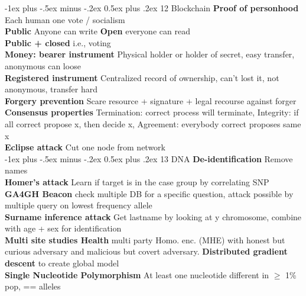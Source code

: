 \documentclass[10pt,landscape]{article}
\makeatletter
\renewcommand{\section}{\@startsection{section}{1}{0mm}%
                                {-1ex plus -.5ex minus -.2ex}%
                                {0.5ex plus .2ex}%
                                {\normalfont\large\bfseries}}
\makeatother
\begin{document}
\begin{multicols*}{4}
\section{12 Blockchain}
\textbf{Proof of personhood} Each human one vote / socialism\\
\textbf{Public} Anyone can write \textbf{Open} everyone can read\\
\textbf{Public + closed} i.e., voting\\
\textbf{Money: bearer instrument} Physical holder or holder of secret, easy transfer, anonymous can loose\\
\textbf{Registered instrument} Centralized record of ownership, can't lost it, not anonymous, transfer hard\\
\textbf{Forgery prevention} Scare resource + signature + legal recourse against forger\\
\textbf{Consensus properties} Termination: correct process will terminate, Integrity: if all correct propose x, then decide x, Agreement: everybody correct proposes same x\\
\textbf{Eclipse attack} Cut one node from network\\


\section{13 DNA}
\textbf{De-identification} Remove names\\
\textbf{Homer's attack} Learn if target is in the case group by correlating SNP\\
\textbf{GA4GH Beacon} check multiple DB for a specific question, attack possible by multiple query on lowest frequency allele\\
\textbf{Surname inference attack} Get lastname by looking at y chromosome, combine with age + sex for identification\\
\textbf{Multi site studies Health} multi party Homo. enc. (MHE) with honest but curious adversary and malicious but covert adversary.
\textbf{Distributed gradient descent} to create global model\\
\textbf{Single Nucleotide Polymorphism} At least one nucleotide different in $\geq$ 1\% pop, == alleles\\



\end{multicols*}
\end{document}
